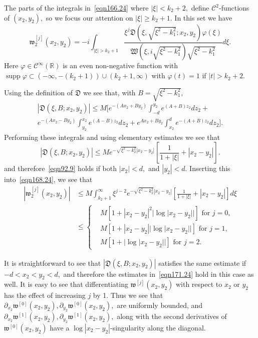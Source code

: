 \documentclass[11pt]{article}
\newcommand\fw{\mathfrak w}
\newcommand\fW{\mathfrak W}
\newcommand\cC{\mathcal{C}}
\newcommand\fD{\mathfrak D}
\newcommand\bbR{\mathbb R}
\newcommand\pa{\partial}
\newcommand\supp{\operatorname{supp}}
\theoremstyle{definition}
\theoremstyle{remark}
\begin{document}
   The parts of the integrals in~\eqref{eqn166.24} where
   $|\xi|<k_2+2,$ define  $\cC^2$-functions of $(x_2,y_2),$ so we focus our
   attention on $|\xi|\geq k_2+1.$ In this set we have
   \begin{equation}\label{eqn168.24}
     \fw^{[j]}_2(x_2,y_2)=-i\int_{|\xi|>k_2+1}\frac{\xi^j\fD(\xi,\sqrt{\xi^2-k_1^2};x_2,y_2)\varphi(\xi)}
        {\fW(\xi,i\sqrt{\xi^2-k_1^2})\sqrt{\xi^2-k_1^2}}d\xi.
   \end{equation}
   Here $\varphi\in\cC^{\infty}(\bbR)$ is an even non-negative function with
   $\supp\varphi\subset (-\infty,-(k_2+1))\cup (k_2+1,\infty)$ with $\varphi(t)=1$ if $|t|>k_2+2.$

   Using the definition of $\fD$ we see that,  with $B=\sqrt{\xi^2-k_1^2},$
   \begin{multline}
     |\fD(\xi,B;x_2,y_2)|\leq
     M\Bigg[e^{-(Ax_2+By_2)}\int_{-d}^{y_2}e^{(A+B)z_2}dz_2+\\
         e^{-(Ax_2-By_2)} \int_{y_2}^{x_2}  e^{(A-B)z_2}dz_2+
           e^{Ax_2+By_2} \int_{x_2}^{d}  e^{-(A+B)z_2}dz_2\Bigg].
   \end{multline}
   Performing these integrals and using elementary estimates we see that
   \begin{equation}
      |\fD(\xi,B;x_2,y_2)|\leq Me^{-\sqrt{\xi^2-k_2^2}|x_2-y_2|}\left[\frac{1}{1+|\xi|}+|x_2-y_2|\right].
   \end{equation}
   and therefore~\eqref{eqn92.9} holds if both $|x_2|<d,$ and $|y_2|<d.$
      Inserting this into~\eqref{eqn168.24},  we see that
   \begin{equation}\label{eqn171.24}
     \begin{split}
     |\fw^{[j]}_2(x_2,y_2)|&\leq
     M\int_{k_2+1}^{\infty}\xi^{j-2}e^{-\sqrt{\xi^2-k_2^2}|x_2-y_2|}\left[\frac{1}{1+|\xi|}+
       |x_2-y_2|\right]d\xi\\
     &\leq\begin{cases} &M[1+|x_2-y_2|^2|\log|x_2-y_2||]\text{ for }j=0,\\
     &M[1+|x_2-y_2||\log|x_2-y_2||]\text{ for }j=1,\\
     &M[1+|\log|x_2-y_2||]\text{ for }j=2.
     \end{cases}
     \end{split}
   \end{equation}

   It is straightforward to see that $|\fD(\xi,B;x_2,y_2)|$ satisfies the same
   estimate if $-d<x_2<y_2<d,$ and therefore the estimates in~\eqref{eqn171.24}
   hold in this case as well. It is easy to see that differentiating
   $\fw^{[j]}(x_2,y_2)$ with respect to $x_2$ or $y_2$ has the effect of
   increasing $j$ by 1. Thus we see that $\pa_{x_2}\fw^{[0]}(x_2,y_2),
   \pa_{y_2}\fw^{[0]}(x_2,y_2),$ are uniformly bounded, and
   $\pa_{x_2}\fw^{[1]}(x_2,y_2), \pa_{y_2}\fw^{[1]}(x_2,y_2),$ along with the second
   derivatives of $\fw^{[0]}(x_2,y_2)$ have a $\log|x_2-y_2|$-singularity along the
   diagonal.
\end{document}
